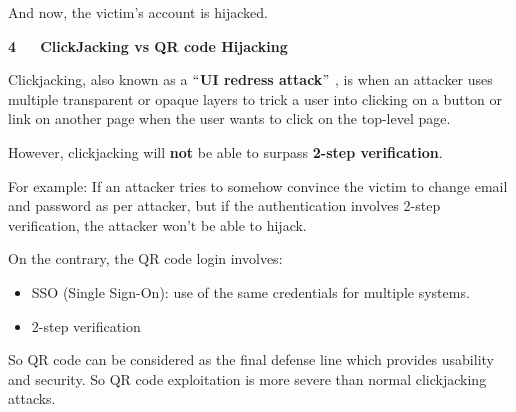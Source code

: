 \documentclass[12pt]{report}
\renewcommand{\_}{\kern-1.5pt\textunderscore\kern-1.5pt}
\begin{document}
\begin{adjustwidth}{0.0in}{-0.19in}
And now, the victim’s account is hijacked.\par

\end{adjustwidth}


\vspace{\baselineskip}
\begin{FlushLeft}
{\fontsize{18pt}{21.6pt}\selectfont \textbf{4\ \ \  ClickJacking vs QR code Hijacking}\par}
\end{FlushLeft}\par

\begin{FlushLeft}
Clickjacking, also known as a $``$\textbf{UI redress attack}$"$ , is when an attacker uses multiple transparent or opaque layers to trick a user into clicking on a button or link on another page when the user wants to click on the top-level page.
\end{FlushLeft}\par

\begin{FlushLeft}
However, clickjacking will \textbf{not} be able to surpass \textbf{2-step verification}.
\end{FlushLeft}\par

\begin{FlushLeft}
For example: If an attacker tries to somehow convince the victim to change email and password as per attacker, but if the authentication involves 2-step verification, the attacker won’t be able to hijack.
\end{FlushLeft}\par

\begin{FlushLeft}
On the contrary, the QR code login involves:
\end{FlushLeft}\par

\begin{itemize}
	\item SSO (Single Sign-On): use of the same credentials for multiple systems.\par

	\item 2-step verification
\end{itemize}\par

\begin{FlushLeft}
So QR code can be considered as the final defense line which provides usability and security. So QR code exploitation is more severe than normal clickjacking attacks.
\end{FlushLeft}\par
\end{document}
